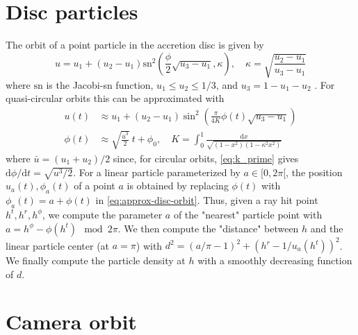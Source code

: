 \documentclass{document}
\newcommand{\diff}{\mathrm d}
\begin{document}
\section{Disc particles}\label{sec:discparticles}

The orbit of a point particle in the accretion disc is given by
\begin{equation*}
u = u_1 + (u_2 - u_1) \mathrm{sn}^2 
    \left(\frac{\phi}{2} \sqrt{u_3 - u_1}, \kappa\right), \quad
\kappa = \sqrt{\frac{u_2 - u_1}{u_3 - u_1}}
\end{equation*}
where $\mathrm{sn}$ is the Jacobi-sn function, $u_1 \le u_2 \le 1/3$, and 
$u_3 = 1 - u_1 - u_2$ \cite{darwin1959}. For quasi-circular orbits this can be 
approximated with
\begin{equation}
\begin{split}
u(t) &\approx 
    u_1 + (u_2 - u_1) \sin^2\left(\frac{\pi}{4K}\phi(t)\sqrt{u_3 - u_1}\right)\\
\phi(t) &\approx
    \sqrt{\frac{\bar{u}^3}{2}}\ t + \phi_0, \quad  
    K = \int_0^1 \frac{\diff x}{\sqrt{(1 - x^2)(1 - \kappa^2x^2)}}
\end{split}\label{eq:approx-disc-orbit}
\end{equation}
where $\bar{u} = (u_1 + u_2) / 2$ since, for circular orbits, 
\eqref{eq:k_prime} gives $\diff\phi / \diff t = \sqrt{u^3 / 2}$. For a linear 
particle parameterized by $a \in [0,2\pi[$, the position $u_a(t), \phi_a(t)$ of 
a point $a$ is obtained by replacing $\phi(t)$ with $\phi_a(t) = a + \phi(t)$ 
in \eqref{eq:approx-disc-orbit}. Thus, given a ray hit point $h^t, h^r, 
h^\phi$, we compute the parameter $a$ of the "nearest" particle point with $a = 
h^\phi - \phi(h^t) \mod 2\pi$. We then compute the "distance" between $h$ and 
the linear particle center (at $a = \pi$) with $d^2 = (a / \pi - 1)^2 + (h^r - 
1 / u_a(h^t))^2$. We finally compute the particle density at $h$ with a 
smoothly decreasing function of $d$.

\section{Camera orbit}\label{sec:cameraorbit}
\end{document}
